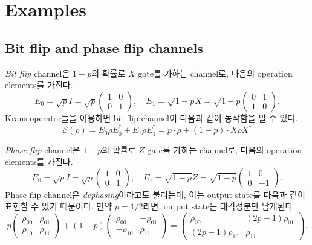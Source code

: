 \section{Examples}
\subsection{Bit flip and phase flip channels}
\textit{Bit flip} channel은 $1-p$의 확률로 $X$ gate를 가하는 channel로, 다음의 operation elements를 가진다.
$$
E_0=\sqrt{p} I=\sqrt{p}\left(\begin{array}{ll}
1 & 0 \\
0 & 1
\end{array}\right), \quad E_1=\sqrt{1-p} X=\sqrt{1-p}\left(\begin{array}{ll}
0 & 1 \\
1 & 0
\end{array}\right) .
$$
Kraus operator들을 이용하면 bit flip channel이 다음과 같이 동작함을 알 수 있다.
\begin{equation*}
    \mathcal{E}(\rho) = E_0 \rho E_0^\dagger + E_1 \rho E_1^\dagger = p \cdot \rho + (1-p) \cdot X \rho X^\dagger
\end{equation*}

\textit{Phase flip} channel은 $1-p$의 확률로 $Z$ gate를 가하는 channel로, 다음의 operation elements를 가진다.
$$
E_0=\sqrt{p} I=\sqrt{p}\left(\begin{array}{ll}
1 & 0 \\
0 & 1
\end{array}\right), \quad E_1=\sqrt{1-p} Z=\sqrt{1-p}\left(\begin{array}{cc}
1 & 0 \\
0 & -1
\end{array}\right) .
$$
Phase flip channel은 \textit{dephasing}이라고도 불리는데, 이는 output state를 다음과 같이 표현할 수 있기 때문이다. 만약 $p = 1/2$라면, output state는 대각성분만 남게된다.
$$
p\left(\begin{array}{cc}
\rho_{00} & \rho_{01} \\
\rho_{10} & \rho_{11}
\end{array}\right)+(1-p)\left(\begin{array}{cc}
\rho_{00} & -\rho_{01} \\
-\rho_{10} & \rho_{11}
\end{array}\right)=\left(\begin{array}{cc}
\rho_{00} & (2 p-1) \rho_{01} \\
(2 p-1) \rho_{10} & \rho_{11}
\end{array}\right) .
$$


